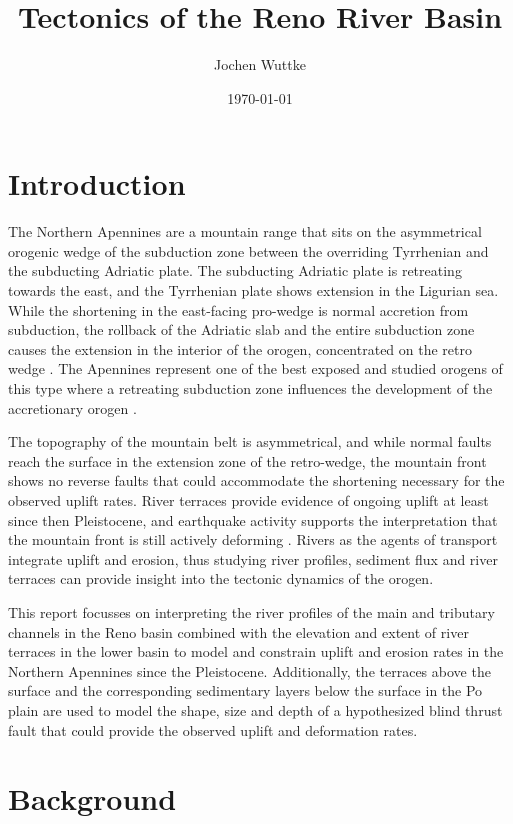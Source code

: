 \documentclass[11pt]{article}
\title{Tectonics of the Reno River Basin}
\author{Jochen Wuttke}
\date{\today}
\begin{document}
\maketitle

\section{Introduction}

The Northern Apennines are a mountain range that sits on the asymmetrical orogenic wedge 
of the subduction zone between the overriding Tyrrhenian and the subducting Adriatic plate.
The subducting Adriatic plate is retreating towards the east, and the Tyrrhenian plate
shows extension in the Ligurian sea.
While the shortening in the east-facing pro-wedge is normal accretion from subduction,
the rollback of the Adriatic slab and the entire subduction zone causes the extension
in the interior of the orogen, concentrated on the retro wedge \parencite{erlanger-2020}.
The Apennines represent one of the best exposed and studied orogens of this type where
a retreating subduction zone influences the development of the accretionary orogen \parencite{picotti-2008}.

The topography of the mountain belt is asymmetrical, and while normal faults reach the surface 
in the extension zone of the retro-wedge, the mountain front shows no reverse faults that
could accommodate the shortening necessary for the observed uplift rates. 
River terraces provide evidence of ongoing uplift at least since then Pleistocene,
and earthquake activity supports the interpretation that the mountain front is still
actively deforming \parencite{picotti-2008}.
Rivers as the agents of transport integrate uplift and erosion, thus studying river profiles,
sediment flux and river terraces can provide insight into the tectonic dynamics of the orogen.

This report focusses on interpreting the river profiles of the main and tributary channels
in the Reno basin combined with the elevation and extent of river terraces in the lower basin
to model and constrain uplift and erosion rates in the Northern Apennines since the Pleistocene.
Additionally, the terraces above the surface and the corresponding sedimentary layers below the
surface in the Po plain are used to model the shape, size and depth of a hypothesized blind
thrust fault that could provide the observed uplift and deformation rates.

\section{Background}
\end{document}
